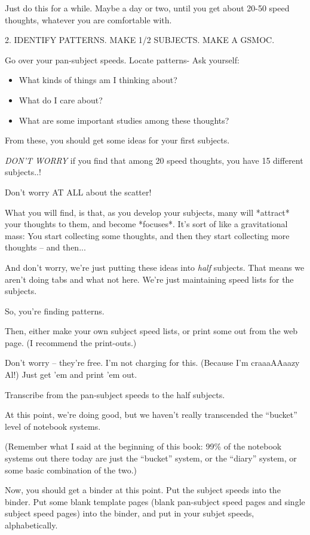 \documentclass[oneside]{scrbook}
\begin{document}
Just do this for a while. Maybe a day or two, until you get about
20-50 speed thoughts, whatever you are comfortable with.


2. IDENTIFY PATTERNS.
   MAKE 1/2 SUBJECTS.
   MAKE A GSMOC.

Go over your pan-subject speeds. Locate patterns-
Ask yourself:

\begin{itemize}
\item What kinds of things am I thinking about?
\item What do I care about?
\item What are some important studies among these thoughts?
\end{itemize}

From these, you should get some ideas for your first subjects.

\emph{DON'T WORRY} if you find that among 20 speed thoughts, you have 15
 different subjects..!

Don't worry AT ALL about the scatter!

What you will find, is that, as you develop your subjects, many will
*attract* your thoughts to them, and become *focuses*. It's sort of
like a gravitational mass: You start collecting some thoughts, and
then they start collecting more thoughts -- and then...

And don't worry, we're just putting these ideas into \emph{half}
subjects. That means we aren't doing tabs and what not here. We're
just maintaining speed lists for the subjects.

So, you're finding patterns.

Then, either make your own subject speed lists, or print some out
from the web page. (I recommend the print-outs.)

Don't worry -- they're free. I'm not charging for this. (Because I'm
craaaAAaazy Al!) Just get 'em and print 'em out.

Transcribe from the pan-subject speeds to the half subjects.

At this point, we're doing good, but we haven't really transcended the
``bucket'' level of notebook systems.

(Remember what I said at the beginning of this book: 99\% of the
notebook systems out there today are just the ``bucket'' system, or the
``diary'' system, or some basic combination of the two.)

Now, you should get a binder at this point. Put the subject speeds
into the binder. Put some blank template pages (blank pan-subject
speed pages and single subject speed pages) into the binder, and put
in your subjet speeds, alphabetically.
\end{document}
